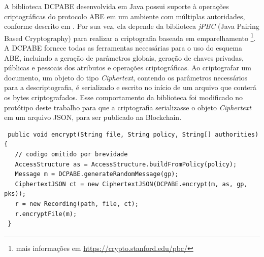 \documentclass[a4paper,11pt]{article}
\begin{document}

A biblioteca DCPABE desenvolvida em Java possui suporte à operações criptográficas do protocolo ABE em um ambiente com múltiplas autoridades, conforme descrito em \cite{Lewko2011}.
Por sua vez, ela depende da biblioteca \emph{jPBC} (Java Pairing Based Cryptography) \cite{DeCaro2011} para realizar a criptografia baseada em emparelhamento
\footnote{mais informações em \href{https://crypto.stanford.edu/pbc/}{https://crypto.stanford.edu/pbc/}}.
A DCPABE fornece todas as ferramentas necessárias para o uso do esquema ABE, incluindo a geração de parâmetros globais, geração de chaves privadas, públicas e pessoais dos atributos e operações criptográficas. %
Ao criptografar um documento, um objeto do tipo \emph{Ciphertext}, contendo os parâmetros necessários para a descriptografia, é serializado e escrito no início de um arquivo que conterá os bytes criptografados.
Esse comportamento da biblioteca foi modificado no protótipo deste trabalho para que a criptografia serializasse o objeto \emph{Ciphertext} em um arquivo JSON, para ser publicado na Blockchain.



\begin{lstlisting}
 public void encrypt(String file, String policy, String[] authorities) {
   // codigo omitido por brevidade
   AccessStructure as = AccessStructure.buildFromPolicy(policy);
   Message m = DCPABE.generateRandomMessage(gp);
   CiphertextJSON ct = new CiphertextJSON(DCPABE.encrypt(m, as, gp, pks));
   r = new Recording(path, file, ct);
   r.encryptFile(m);
 }
\end{lstlisting}
\end{document}

